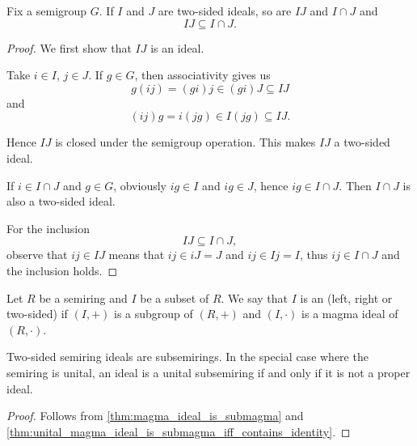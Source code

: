 \begin{proposition}\label{thm:product_of_semigroup_ideals_is_in_intersection}
  Fix a semigroup \( G \). If \( I \) and \( J \) are two-sided ideals, so are \( IJ \) and \( I \cap J \) and
  \begin{equation*}
    IJ \subseteq I \cap J.
  \end{equation*}
\end{proposition}
\begin{proof}
  We first show that \( IJ \) is an ideal.

  Take \( i \in I \), \( j \in J \). If \( g \in G \), then associativity gives us
  \begin{equation*}
    g(ij) = (gi)j \in (gi)J \subseteq IJ
  \end{equation*}
  and
  \begin{equation*}
    (ij)g = i(jg) \in I(jg) \subseteq IJ.
  \end{equation*}

  Hence \( IJ \) is closed under the semigroup operation. This makes \( IJ \) a two-sided ideal.

  If \( i \in I \cap J \) and \( g \in G \), obviously \( ig \in I \) and \( ig \in J \), hence \( ig \in I \cap J \). Then \( I \cap J \) is also a two-sided ideal.

  For the inclusion
  \begin{equation*}
    IJ \subseteq I \cap J,
  \end{equation*}
  observe that \( ij \in IJ \) means that \( ij \in iJ = J \) and \( ij \in Ij = I \), thus \( ij \in I \cap J \) and the inclusion holds.
\end{proof}

\begin{definition}\label{def:semiring_ideal}
  Let \( R \) be a semiring and \( I \) be a subset of \( R \). We say that \( I \) is an  (left, right or two-sided) if \( (I, +) \) is a subgroup of \( (R, +) \) and \( (I, \cdot) \) is a magma ideal of \( (R, \cdot) \).
\end{definition}

\begin{proposition}\label{thm:semiring_ideal_is_nonunital_subsemiring}
  Two-sided semiring ideals are subsemirings. In the special case where the semiring is unital, an ideal is a unital subsemiring if and only if it is not a proper ideal.
\end{proposition}
\begin{proof}
  Follows from \cref{thm:magma_ideal_is_submagma} and \cref{thm:unital_magma_ideal_is_submagma_iff_contains_identity}.
\end{proof}

